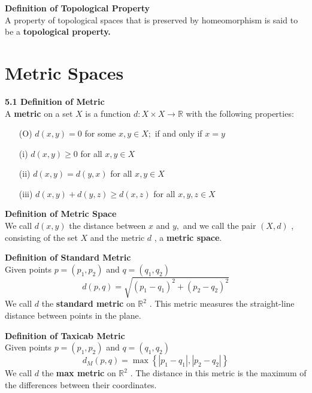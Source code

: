 \documentclass[12pt]{article}
\newenvironment{defn}[2][]{\par \medskip \noindent \textbf{#1 Definition of \large#2 \medskip \\}}{\rmfamily \medskip}
\begin{document}
	\begin{defn}{Topological Property}
		A property of topological spaces that is preserved by homeomorphism is
		said to be a \textbf{topological property.}
	\end{defn}

	\section{Metric Spaces}
	\begin{defn}[5.1]{Metric}
		A \textbf{metric} on a set $X$ is a function  $d : X \times X \rightarrow \mathbb { R }$ with the following properties:
		\begin{enumerate}
			\item[(O)]  $d ( x , y ) = 0$ for some $x , y \in X ;$ if and only if $x = y$
			\item[(i)] $d ( x , y ) \geq 0$ for all $x , y \in X$
			\item[(ii)]  $d ( x , y ) = d ( y , x )$ for all $x , y \in X$
			\item[(iii)] $d ( x , y ) + d ( y , z ) \geq d ( x , z )$ for all $x , y , z \in X$
		\end{enumerate}
	\end{defn}
	
	\begin{defn}{Metric Space}
		We call $d ( x , y )$ the distance between $x$ and $y ,$ and we call the pair $( X , d )$ , consisting of the set $X$ and the metric $d$ , a \textbf{metric space}.
	\end{defn}

	\begin{defn}{Standard Metric}
		Given points $ p = {(p_1,p_2)} $ and $ q = (q_1,q_2) $
		\[d ( p , q ) = \sqrt { \left( p _ { 1 } - q _ { 1 } \right) ^ { 2 } + \left( p _ { 2 } - q _ { 2 } \right) ^ { 2 } }\]
		We call $d$ the\textbf{ standard metric} on $\mathbb { R } ^ { 2 }$ . This metric measures the straight-line distance between points in the plane.
	\end{defn}

	\begin{defn}{Taxicab Metric}
		Given points $ p = {(p_1,p_2)} $ and $ q = (q_1,q_2) $
		\[d _ { M } ( p , q ) = \max \left\{ \left| p _ { 1 } - q _ { 1 } \right| , \left| p _ { 2 } - q _ { 2 } \right| \right\}\]
		We call $d$ the\textbf{ max metric} on $\mathbb { R } ^ { 2 }$ . The distance in this metric is the maximum of the differences between their coordinates.
	\end{defn}
		  
\end{document}
